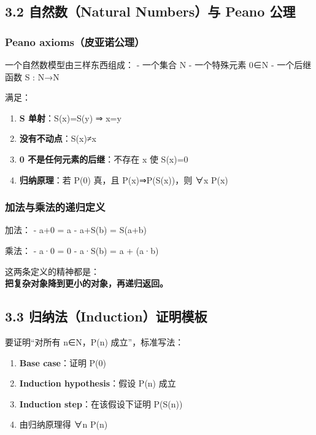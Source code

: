 \documentclass[
  11pt,
]{article}
\providecommand{\tightlist}{%
  \setlength{\itemsep}{0pt}\setlength{\parskip}{0pt}}
\begin{document}
\subsection{3.2 自然数（Natural Numbers）与 Peano
公理}\label{ux81eaux7136ux6570natural-numbersux4e0e-peano-ux516cux7406}

\subsubsection{Peano
axioms（皮亚诺公理）}\label{peano-axiomsux76aeux4e9aux8bfaux516cux7406}

一个自然数模型由三样东西组成： - 一个集合 N - 一个特殊元素 0∈N -
一个后继函数 S : N→N

满足：

\begin{enumerate}
\def\labelenumi{\arabic{enumi}.}
\tightlist
\item
  \textbf{S 单射}：S(x)=S(y) ⇒ x=y\\
\item
  \textbf{没有不动点}：S(x)≠x\\
\item
  \textbf{0 不是任何元素的后继}：不存在 x 使 S(x)=0\\
\item
  \textbf{归纳原理}：若 P(0) 真，且 P(x)⇒P(S(x))，则 ∀x P(x)
\end{enumerate}

\subsubsection{加法与乘法的递归定义}\label{ux52a0ux6cd5ux4e0eux4e58ux6cd5ux7684ux9012ux5f52ux5b9aux4e49}

加法： - a+0 = a - a+S(b) = S(a+b)

乘法： - a·0 = 0 - a·S(b) = a + (a·b)

这两条定义的精神都是：\\
\textbf{把复杂对象降到更小的对象，再递归返回。}

\subsection{3.3
归纳法（Induction）证明模板}\label{ux5f52ux7eb3ux6cd5inductionux8bc1ux660eux6a21ux677f}

要证明``对所有 n∈N，P(n) 成立''，标准写法：

\begin{enumerate}
\def\labelenumi{\arabic{enumi}.}
\tightlist
\item
  \textbf{Base case}：证明 P(0)
\item
  \textbf{Induction hypothesis}：假设 P(n) 成立
\item
  \textbf{Induction step}：在该假设下证明 P(S(n))
\item
  由归纳原理得 ∀n P(n)
\end{enumerate}
\end{document}
